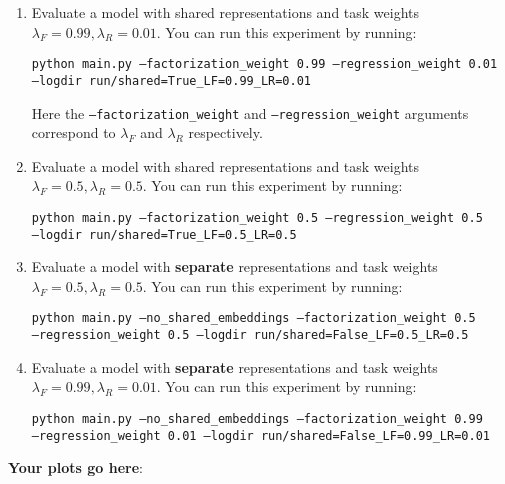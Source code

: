 \documentclass[12pt]{article}
\begin{document}
\begin{enumerate}
    \item Evaluate a model with shared representations and task weights $\lambda_F=0.99, \lambda_R=0.01$. You can run this experiment by running:
    
    \texttt{python main.py --factorization\_weight 0.99 --regression\_weight 0.01 \\--logdir run/shared=True\_LF=0.99\_LR=0.01}
    
    Here the \texttt{--factorization\_weight} and \texttt{--regression\_weight} arguments correspond to $\lambda_F$ and  $\lambda_R$ respectively.
    
    \item Evaluate a model with shared representations and task weights $\lambda_F=0.5, \lambda_R=0.5$. You can run this experiment by running:    
    
    \texttt{python main.py --factorization\_weight 0.5 --regression\_weight 0.5 \\--logdir run/shared=True\_LF=0.5\_LR=0.5}
    
    \item Evaluate a model with \textbf{separate} representations and task weights $\lambda_F=0.5, \lambda_R=0.5$. You can run this experiment by running:    
    
    \texttt{python main.py --no\_shared\_embeddings --factorization\_weight 0.5 \\ --regression\_weight 0.5 --logdir run/shared=False\_LF=0.5\_LR=0.5}
    
     \item Evaluate a model with \textbf{separate} representations and task weights $\lambda_F=0.99, \lambda_R=0.01$. You can run this experiment by running:    
    
    \texttt{python main.py --no\_shared\_embeddings --factorization\_weight 0.99 \\ --regression\_weight 0.01 --logdir run/shared=False\_LF=0.99\_LR=0.01}
    
\end{enumerate}

\noindent\textbf{Your plots go here}:
\end{document}
